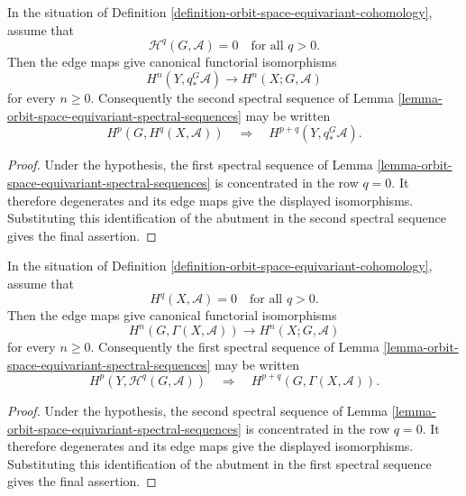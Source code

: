 \begin{lemma}
\label{lemma-orbit-space-equivariant-cohomology-degeneration}
\begin{reference}
\cite[Chapter V, \S 5.2, Proposition 5.2.3, p. 202]{Tohoku}
\end{reference}
In the situation of Definition
\ref{definition-orbit-space-equivariant-cohomology}, assume that
$$
\mathcal{H}^q(G, \mathcal{A}) = 0
\quad\text{for all }q > 0.
$$
Then the edge maps give canonical functorial isomorphisms
$$
H^n(Y, q_*^G\mathcal{A})
\longrightarrow
H^n(X; G, \mathcal{A})
$$
for every $n \geq 0$. Consequently the second spectral sequence of Lemma
\ref{lemma-orbit-space-equivariant-spectral-sequences} may be written
$$
H^p(G, H^q(X, \mathcal{A}))
\quad\Longrightarrow\quad
H^{p + q}(Y, q_*^G\mathcal{A}).
$$
\end{lemma}

\begin{proof}
Under the hypothesis, the first spectral sequence of Lemma
\ref{lemma-orbit-space-equivariant-spectral-sequences} is concentrated in
the row $q=0$. It therefore degenerates and its edge maps give the displayed
isomorphisms. Substituting this identification of the abutment in the second
spectral sequence gives the final assertion.
\end{proof}

\begin{lemma}
\label{lemma-orbit-space-equivariant-cohomology-global-acyclic}
\begin{reference}
\cite[Chapter V, \S 5.2, Proposition 5.2.4, p. 202]{Tohoku}
\end{reference}
In the situation of Definition
\ref{definition-orbit-space-equivariant-cohomology}, assume that
$$
H^q(X, \mathcal{A})=0
\quad\text{for all }q>0.
$$
Then the edge maps give canonical functorial isomorphisms
$$
H^n(G, \Gamma(X, \mathcal{A}))
\longrightarrow
H^n(X; G, \mathcal{A})
$$
for every $n \geq 0$. Consequently the first spectral sequence of Lemma
\ref{lemma-orbit-space-equivariant-spectral-sequences} may be written
$$
H^p(Y, \mathcal{H}^q(G, \mathcal{A}))
\quad\Longrightarrow\quad
H^{p + q}(G, \Gamma(X, \mathcal{A})).
$$
\end{lemma}

\begin{proof}
Under the hypothesis, the second spectral sequence of Lemma
\ref{lemma-orbit-space-equivariant-spectral-sequences} is concentrated in
the row $q=0$. It therefore degenerates and its edge maps give the displayed
isomorphisms. Substituting this identification of the abutment in the first
spectral sequence gives the final assertion.
\end{proof}

